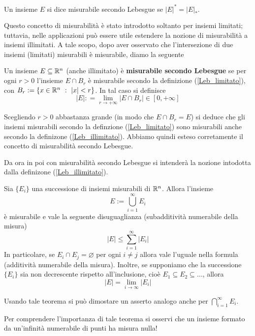 \begin{defn}
\label{Leb_limitato}
Un insieme $E$ si dice misurabile secondo Lebesgue se $| E|^{*} = | E|_{*}$.
\end{defn}
Questo concetto di misurabilità è stato introdotto soltanto per insiemi limitati; tuttavia, nelle applicazioni può essere utile estendere la nozione di misurabilità a insiemi illimitati. A tale scopo, dopo aver osservato che l'intersezione di due insiemi (limitati) misurabili è misurabile, diamo la seguente
\begin{defn}
\label{Leb_illimitato}
Un insieme $E\subseteq\mathbb{R}^n$ (anche illimitato) è \textbf{misurabile secondo Lebesgue} se per ogni $r>0$ l'insieme $E\cap B_{r}$ è misurabile secondo la definizione (\ref{Leb_limitato}), con $B_r:=\{x\in\mathbb{R}^n\ :\ |x|<r \}$. In tal caso si definisce
$$
| E| : = \lim\limits_{r\rightarrow + \infty}| E\cap B_{r}| \in[0,+\infty]
$$
\end{defn}
\begin{rem}
Scegliendo $r>0$ abbastanza grande (in modo che $E\cap B_{r}=E$) si deduce che gli insiemi misurabili secondo la definzione (\ref{Leb_limitato}) sono misurabili anche secondo la definizone (\ref{Leb_illimitato}). Abbiamo quindi esteso corretamente il concetto di misurabilità secondo Lebesgue.
\end{rem}
Da ora in poi con misurabilità secondo Lebesgue si intenderà la nozione intodotta dalla definizone (\ref{Leb_illimitato}).

\newpage

\begin{thm}
Sia $\{E_i\}$ una successione di insiemi misurabili di $\mathbb{R}^n$. Allora l'insieme 
$$
E:=\bigcup_{i=1}^\infty E_i
$$ 
è misurabile e vale la seguente disuguaglianza (subadditività numerabile della misura)
$$
|E|\leq \sum_{i=1}^\infty |E_i|
$$
In particolare, se $E_i\cap E_j=\varnothing$ per ogni $i\neq j$ allora vale l'uguale nella formula (additività numerabile della misura). Inoltre, se supponiamo che la successione $\{E_i\}$ sia non decrescente rispetto all'inclusione, cioè $E_1\subseteq E_2\subseteq\dots$, allora
$$
|E|=\lim_{i\to\infty}|E_i|
$$ 
\end{thm}
\begin{rem}
Usando tale teorema si può dimostare un asserto analogo anche per $\displaystyle\bigcap_{i=1}^\infty E_i$.
\end{rem}
Per comprendere l'importanza di tale teorema si osservi che un insieme formato da un'infinità numerabile di punti ha misura nulla!

